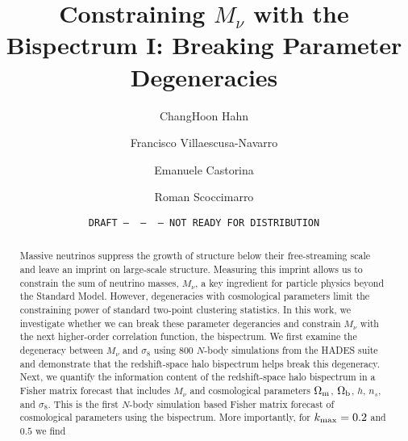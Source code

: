 \documentclass[12pt, letterpaper, preprint]{aastex62}
\newcommand{\Om}{\Omega_{\rm m}}
\newcommand{\Ob}{\Omega_{\rm b}}
\newcommand{\smnu}{M_\nu}
\newcommand{\sig}{\sigma_8}
\begin{document}
\sloppy\sloppypar\frenchspacing 

\title{Constraining $\smnu$ with the Bispectrum I: Breaking Parameter Degeneracies} 
\date{\texttt{DRAFT~---~\githash~---~\gitdate~---~NOT READY FOR DISTRIBUTION}}

\author{ChangHoon Hahn}

\author{Francisco Villaescusa-Navarro} 

\author{Emanuele Castorina} 

\author{Roman Scoccimarro} 

\begin{abstract}
    Massive neutrinos suppress the growth of structure below their free-streaming scale and leave an 
    imprint on large-scale structure. Measuring this imprint allows us to constrain the sum of neutrino 
    masses, $\smnu$, a key ingredient for particle physics beyond the Standard Model. However, 
    degeneracies with cosmological parameters limit the constraining power of standard two-point clustering 
    statistics. In this work, we investigate whether we can break these parameter degerancies and constrain 
    $\smnu$ with the next higher-order correlation function, the bispectrum. We first examine the degeneracy 
    between $\smnu$ and $\sig$ using $800$ $N$-body simulations from the HADES suite and demonstrate that 
    the redshift-space halo bispectrum helps break this degeneracy.
    Next, we quantify the information content 
    of the redshift-space halo bispectrum in a Fisher matrix forecast that includes $\smnu$ and cosmological 
    parameters $\Om$, $\Ob$, $h$, $n_s$, and $\sig$. 
    This is the first $N$-body simulation based Fisher matrix forecast of cosmological parameters using the 
    bispectrum. More importantly, for $k_{\rm max} = 0.2$ and $0.5$ we find 
\end{abstract}
\end{document}
